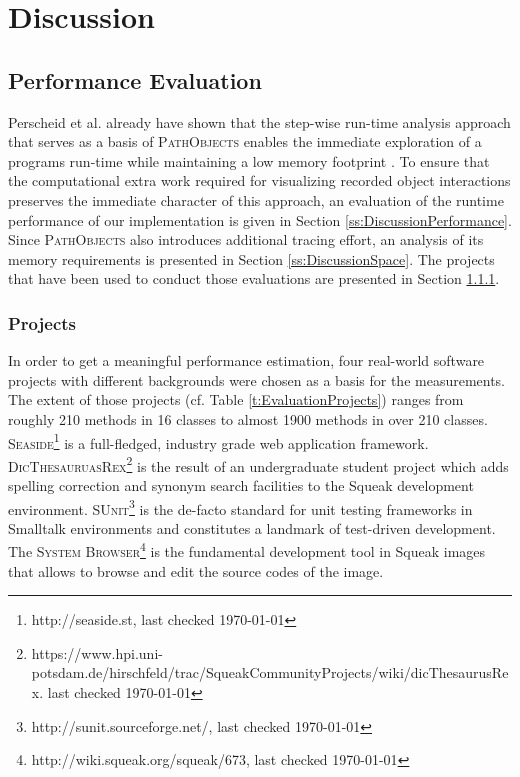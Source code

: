 \chapter{Discussion}
\label{c:discussion}

\section{Performance Evaluation}
Perscheid et al. already have shown that the step-wise run-time analysis approach that serves as a basis of \textsc{PathObjects} enables the immediate exploration of a programs run-time while maintaining a low memory footprint  \cite{perscheid_immediacy_2010}.
To ensure that the computational extra work required for visualizing recorded object interactions preserves the immediate character of this approach, an evaluation of the runtime performance of our implementation is given in Section \ref{ss:DiscussionPerformance}.
Since \textsc{PathObjects} also introduces additional tracing effort, an analysis of its memory requirements is presented in Section \ref{ss:DiscussionSpace}.
The projects that have been used to conduct those evaluations are presented in Section \ref{ss:DiscussionProjects}.

\subsection{Projects}
\label{ss:DiscussionProjects}
In order to get a meaningful performance estimation, four real-world software projects with different backgrounds were chosen as a basis for the measurements.
The extent of those projects (cf. Table \ref{t:EvaluationProjects}) ranges from roughly 210 methods in 16 classes to almost 1900 methods in over 210 classes.
\textsc{Seaside}\footnote{http://seaside.st, last checked \today} is a full-fledged, industry grade web application framework.
\textsc{DicThesauruasRex}\footnote{https://www.hpi.uni-potsdam.de/hirschfeld/trac/SqueakCommunityProjects/wiki/dicThesaurusRex. last checked \today} is the result of an undergraduate student project which adds spelling correction and synonym search facilities to the Squeak development environment.
\textsc{SUnit}\footnote{http://sunit.sourceforge.net/, last checked \today} is the de-facto standard for unit testing frameworks in Smalltalk environments and constitutes a landmark of test-driven development.
The \textsc{System Browser}\footnote{http://wiki.squeak.org/squeak/673, last checked \today} is the fundamental development tool in Squeak images that allows to browse and edit the source codes of the image.

